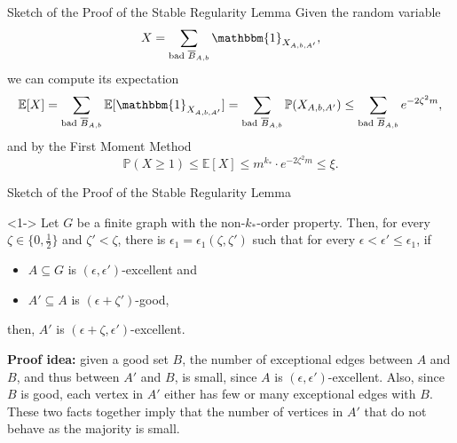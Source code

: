 \documentclass{beamer}
\newcommand{\parcurly}[1]{\{ #1 \}}
\newcommand{\parround}[1]{( #1 )}
\begin{document}
\begin{frame}{Sketch of the Proof of the Stable Regularity Lemma}
     {
        Given the random variable
        \[
            X = \sum_{\text{bad } \overline{B}_{A,b}} \mathbbm{1}_{X_{A,b,A'}},
        \]
    }
     {
        we can compute its expectation
        \[
            \mathbb{E}[X] = \sum_{\text{bad } \overline{B}_{A,b}} \mathbb{E}[\mathbbm{1}_{X_{A,b,A'}}]
                = \sum_{\text{bad } \overline{B}_{A,b}} \mathbb{P}\parround{X_{A,b,A'}}
                \leq \sum_{\text{bad } \overline{B}_{A,b}} e^{-2\zeta^2 m},
        \]
    }
     {
        and by the First Moment Method
        \[
            \mathbb{P}\parround{X \geq 1} \leq \mathbb{E}[X] \leq m^{k_*} \cdot e^{-2\zeta^2 m} \leq \xi.
        \]
    }
\end{frame}

\begin{frame}{Sketch of the Proof of the Stable Regularity Lemma}
    \begin{lemma}<1->
        Let $G$ be a finite graph with the non-$k_{*}$-order property.
        Then, for every $\zeta \in \parcurly{0, \frac{1}{2}}$ and $\zeta' < \zeta$, there is
        $\epsilon_1 = \epsilon_1(\zeta, \zeta')$ such that for every $\epsilon < \epsilon' \leq \epsilon_1$, if
        \begin{itemize}
            \item $A \subseteq G$ is $\parround{\epsilon, \epsilon'}$-excellent and
            \item $A' \subseteq A$ is $\parround{\epsilon + \zeta'}$-good,
        \end{itemize}
        then, $A'$ is $\parround{\epsilon + \zeta, \epsilon'}$-excellent.
    \end{lemma}

    \textbf{Proof idea:} given a good set $B$, the number of exceptional
    edges between $A$ and $B$, and thus between $A'$ and $B$, is small, since $A$ is $(\epsilon, \epsilon')$-excellent.
    Also, since $B$ is good, each vertex in $A'$ either has few or many exceptional edges with $B$.
    These two facts together imply that the number of vertices in $A'$ that do not behave as the majority is small.
\end{frame}
\end{document}
